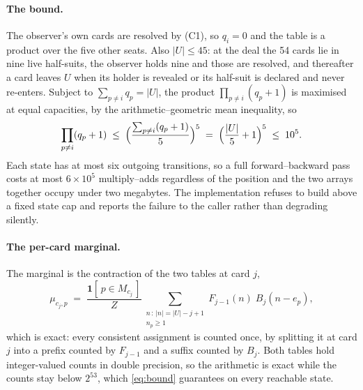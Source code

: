 \paragraph{The bound.} The observer's own cards are resolved by (C1), so $q_i =
0$ and the table is a product over the five other seats. Also $|U| \le 45$: at
the deal the 54 cards lie in nine live half-suits, the observer holds nine and
those are resolved, and thereafter a card leaves $U$ when its holder is revealed
or its half-suit is declared and never re-enters. Subject to $\sum_{p\ne i} q_p =
|U|$, the product $\prod_{p \ne i}(q_p+1)$ is maximised at equal capacities, by
the arithmetic--geometric mean inequality, so
\begin{equation}
  \prod_{p\ne i}(q_p+1) \;\le\; \Bigl(\frac{\sum_{p \ne i}(q_p+1)}{5}\Bigr)^{5}
  \;=\; \Bigl(\frac{|U|}{5}+1\Bigr)^{5} \;\le\; 10^{5}.
  \label{eq:bound}
\end{equation}
Each state has at most six outgoing transitions, so a full forward--backward pass
costs at most $6 \times 10^5$ multiply--adds regardless of the position and the
two arrays together occupy under two megabytes. The implementation refuses to
build above a fixed state cap and reports the failure to the caller rather than
degrading silently.

\paragraph{The per-card marginal.} The marginal is the contraction of the two
tables at card $j$,
\begin{equation}
  \mu_{c_j, p}
    \;=\; \frac{\mathbf{1}[\,p \in M_{c_j}\,]}{Z}
      \sum_{\substack{n \,:\, |n| = |U| - j + 1 \\ n_p \ge 1}}
        F_{j-1}(n)\; B_j(n - e_p),
  \label{eq:marg}
\end{equation}
which is exact: every consistent assignment is counted once, by splitting it at
card $j$ into a prefix counted by $F_{j-1}$ and a suffix counted by $B_j$. Both
tables hold integer-valued counts in double precision, so the arithmetic is exact
while the counts stay below $2^{53}$, which \eqref{eq:bound} guarantees on every
reachable state.

